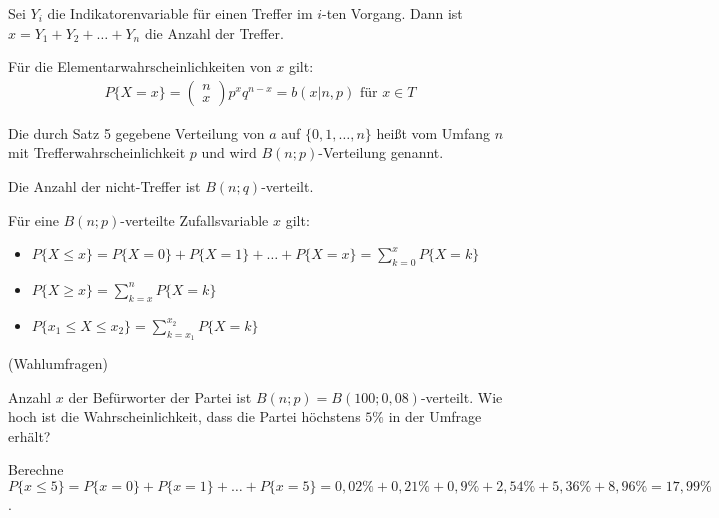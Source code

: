 Sei $Y_i$ die Indikatorenvariable für einen Treffer im $i$-ten Vorgang. Dann ist $x = Y_1 + Y_2 + \dots + Y_n$ die Anzahl der Treffer.

Für die Elementarwahrscheinlichkeiten von $x$ gilt:
\begin{align*}
    P\{X = x\} = \begin{pmatrix}n\\x\end{pmatrix}p^xq^{n-x} = b(x|n,p)\text{ für }x\in T
\end{align*}

Die durch Satz 5 gegebene Verteilung von $a$ auf $\{0,1,\dots,n\}$ heißt  vom Umfang $n$ mit Trefferwahrscheinlichkeit $p$ und wird $B(n;p)$-Verteilung genannt.

Die Anzahl der nicht-Treffer ist $B(n;q)$-verteilt.

Für eine $B(n;p)$-verteilte Zufallsvariable $x$ gilt:
\begin{itemize}
    \item{$P\{X \leq x\} = P\{X = 0\} + P\{X = 1\} + \dots + P\{X = x\} = \sum_{k = 0}^x P\{X = k\}$}
    \item{$P\{X \geq x\} = \sum_{k = x}^{n} P\{X = k\}$}
    \item{$P\{x_1 \leq X \leq x_2\} = \sum_{k = x_1}^{x_2} P\{X = k\}$}
\end{itemize}

 (Wahlumfragen)

Anzahl $x$ der Befürworter der Partei ist $B(n;p) = B(100;0,08)$-verteilt. Wie hoch ist die Wahrscheinlichkeit, dass die Partei höchstens $5\%{}$ in der Umfrage erhält?

Berechne $P\{x \leq 5\} = P\{x = 0\} + P\{x = 1\} + \dots + P\{x = 5\} = 0,02\%{} + 0,21\%{} + 0,9\%{} + 2,54\%{} + 5,36\%{} + 8,96\%{} = 17,99\%{}$.











